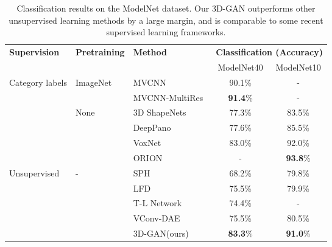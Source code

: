 \documentclass{article}
\newcommand{\model}{3D-GAN\xspace}
\begin{document}
\begin{table}[t]
\begin{center}
\small
\begin{tabular}{lllcc}
\toprule
\multirow{2}{*}{\bf Supervision} & \multirow{2}{*}{\bf Pretraining} & \multirow{2}{*}{\bf Method} & \multicolumn{2}{c}{\bf Classification (Accuracy)}  \\
\cmidrule{4-5}
& & & ModelNet40 & ModelNet10 \\
\midrule
\multirow{6}{*}{Category labels} & \multirow{2}{*}{ImageNet} &MVCNN~\citep{su2015multi} & 90.1\% & - \\
& &MVCNN-MultiRes~\citep{qi2016volumetric} & {\bf 91.4}\% & - \\
\cmidrule{2-5}
& \multirow{4}{*}{None} &3D ShapeNets~\citep{wu20153d} & 77.3\% & 83.5\%\\
& &DeepPano~\citep{shi2015deeppano} & 77.6\% & 85.5\% \\
& &VoxNet~\citep{maturana2015voxnet} & 83.0\% & 92.0\% \\
& &ORION~\citep{sedaghat2016orientation} & - & {\bf 93.8}\% \\
\midrule
\multirow{5}{*}{Unsupervised} & \multirow{5}{*}{-} & SPH~\citep{kazhdan2003rotation} & 68.2\% & 79.8\%\\
& &LFD~\citep{chen2003visual} & 75.5\% & 79.9\% \\
& &T-L Network~\citep{girdhar2016learning} & 74.4\% & -\\
& &VConv-DAE~\citep{sharma2016vconv} & 75.5\% & 80.5\% \\
& &\model (ours) & {\bf 83.3}\% & {\bf 91.0}\% \\    
\bottomrule
\end{tabular}
\end{center}
\caption{Classification results on the ModelNet dataset. Our \model outperforms other unsupervised learning methods by a large margin, and is comparable to some recent supervised learning frameworks.}
\vspace{-15pt}
\label{tbl:modelnet}
\end{table}
\end{document}
